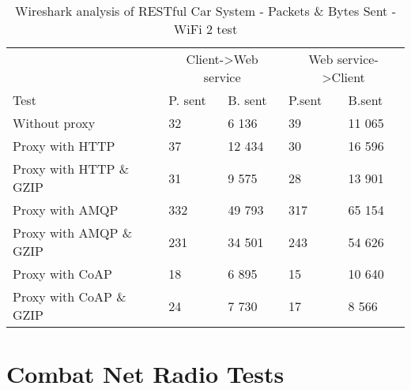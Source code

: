 \begin{appendices}
\begin{table}[H]
\begin{tabularx}{\textwidth}{lXXXX}
\hline
\multicolumn{1}{l}{}                  & \multicolumn{2}{c}{Client->Web service}                           & \multicolumn{2}{c}{Web service->Client}                           \\
\multicolumn{1}{l}{Test} & \multicolumn{1}{l}{P. sent} & \multicolumn{1}{l}{B. sent} & \multicolumn{1}{l}{P.sent} & \multicolumn{1}{l}{B.sent} \\ \hline
Without proxy                           & 32                                            & 6 136                                    & 39                                            & 11 065                                   \\
Proxy with HTTP                         & 37                                            & 12 434                                   & 30                                            & 16 596                                   \\
Proxy with HTTP \& GZIP                 & 31                                            & 9 575                                    & 28                                            & 13 901 \\
Proxy with AMQP                         & 332                                            & 49 793                                    & 317                                            & 65 154 \\
Proxy with AMQP \& GZIP                 & 231                                            & 34 501                                    & 243                                            & 54 626 \\
Proxy with CoAP                         & 18                                            & 6 895                                    & 15                                            & 10 640 \\
Proxy with CoAP \& GZIP                 & 24                                            & 7 730                                    & 17                                            & 8 566

\end{tabularx}
\caption{Wireshark analysis of RESTful Car System - Packets \& Bytes Sent - WiFi 2 test}

\end{table}


\section{Combat Net Radio Tests}


\end{appendices}
